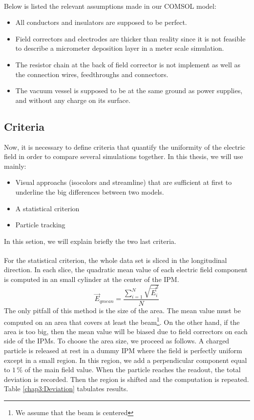 \begin{refsection}
	\paragraph{}
	Below is listed the relevant assumptions made in our COMSOL model:
	\begin{itemize}
		\item All conductors and insulators are supposed to be perfect.
		\item Field correctors and electrodes are thicker than reality since it is not feasible to describe a micrometer deposition layer in a meter scale simulation.
		\item The resistor chain at the back of field corrector is not implement as well as the connection wires, feedthroughs and connectors.
		\item The vacuum vessel is supposed to be at the same ground as power supplies, and without any charge on its surface.
	\end{itemize}

	\subsection{Criteria}

	Now, it is necessary to define criteria that quantify the uniformity of the electric field in order to compare several simulations together. In this thesis, we will use mainly:
	\begin{itemize}
		\item Visual approachs (isocolors and streamline) that are sufficient at first to underline the big differences between two models.
		\item A statistical criterion
		\item Particle tracking
	\end{itemize}
	In this setion, we will explain briefly the two last criteria.

	\paragraph{}
	For the statistical criterion, the whole data set is sliced in the longitudinal direction. In each slice, the quadratic mean value of each electric field component is computed in an small cylinder at the center of the IPM.
	\begin{equation}
		\vec{E}_{qmean} = \frac{\sum_{i=1}^{N}\sqrt{\vec{E}_{i}^{2}}}{N}
	\end{equation}
	The only pitfall of this method is the size of the area. The mean value must be computed on an area that covers at least the beam\footnote{We assume that the beam is centered}. On the other hand, if the area is too big, then the mean value will be biased due to field correctors on each side of the IPMs.
	To choose the area size, we proceed as follows. A charged particle is released at rest in a dummy IPM where the field is perfectly uniform except in a small region. In this region, we add a perpendicular component equal to $1\,\mathrm{\%}$ of the main field value. When the particle reaches the readout, the total deviation is recorded. Then the region is shifted and the computation is repeated. Table \ref{chap3:Deviation} tabulates results.


\end{refsection}

